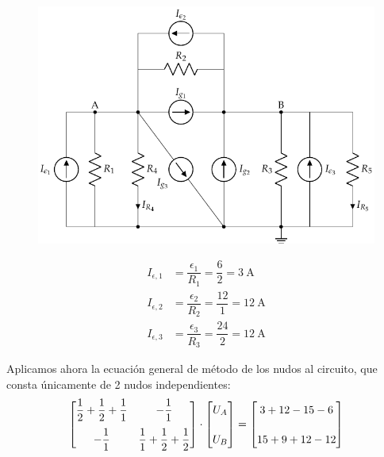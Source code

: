 \begin{example}
          \begin{figure}[H]
            \centering \includegraphics[scale=0.9]{../figs/nudos_fuentes2.pdf}
          \end{figure}

          \vspace{-3mm}
          \begin{align*}
            I_{\epsilon,1}&=\dfrac{\epsilon_1}{R_1}=\dfrac{6}{2}=\qty{3}{\ampere}\\
            I_{\epsilon,2}&=\dfrac{\epsilon_2}{R_2}=\dfrac{12}{1}=\qty{12}{\ampere}\\
            I_{\epsilon,3}&=\dfrac{\epsilon_3}{R_3}=\dfrac{24}{2}=\qty{12}{\ampere}
          \end{align*}

          \vspace{2mm}
        Aplicamos ahora la ecuación general de método de los nudos al circuito, que consta únicamente de 2 nudos independientes:
        \begin{equation*}
        \begin{bmatrix}
          \dfrac{1}{2}+\dfrac{1}{2}+\dfrac{1}{1} & -\dfrac{1}{1}\\[10pt]
          -\dfrac{1}{1} & \dfrac{1}{1}+\dfrac{1}{2}+\dfrac{1}{2}
        \end{bmatrix}
        \cdot
        \begin{bmatrix}
          \vphantom{\dfrac{1}{1}} U_A\\[10pt]
          \vphantom{\dfrac{1}{1}} U_B
        \end{bmatrix}
        =
        \begin{bmatrix}
          \vphantom{\dfrac{1}{1}} 3+12-15-6\\[10pt]
          \vphantom{\dfrac{1}{1}} 15+9+12-12
        \end{bmatrix}
        \end{equation*}
    

\end{example}
